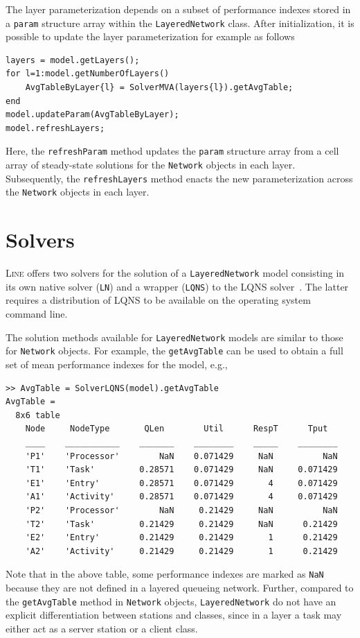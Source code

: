 The layer parameterization depends on a subset of performance indexes stored in a \texttt{param} structure array within the \texttt{LayeredNetwork} class. After initialization, it is possible to update the layer parameterization for example as follows
\begin{lstlisting}
layers = model.getLayers();
for l=1:model.getNumberOfLayers()
    AvgTableByLayer{l} = SolverMVA(layers{l}).getAvgTable;
end
model.updateParam(AvgTableByLayer);
model.refreshLayers;
\end{lstlisting}
Here, the \texttt{refreshParam} method updates the \texttt{param} structure array from a cell array of steady-state solutions for the \texttt{Network} objects in each layer. Subsequently, the \texttt{refreshLayers} method enacts the new parameterization across the \texttt{Network} objects in each layer.

\section{Solvers}
\textsc{Line} offers two solvers for the solution of a \texttt{LayeredNetwork} model consisting in its own native solver (\texttt{LN}) and a wrapper (\texttt{LQNS}) to the LQNS solver~\cite{lqns12}. The latter requires a distribution of LQNS to be available on the operating system command line.

The solution methods available for \texttt{LayeredNetwork} models are similar to those for \texttt{Network} objects. For example, the \texttt{getAvgTable} can be used to obtain a full set of mean performance indexes for the model, e.g.,
\begin{lstlisting}
>> AvgTable = SolverLQNS(model).getAvgTable
AvgTable =
  8x6 table
    Node     NodeType       QLen        Util      RespT      Tput
    ____    ___________    _______    ________    _____    ________
    'P1'    'Processor'        NaN    0.071429     NaN          NaN
    'T1'    'Task'         0.28571    0.071429     NaN     0.071429
    'E1'    'Entry'        0.28571    0.071429       4     0.071429
    'A1'    'Activity'     0.28571    0.071429       4     0.071429
    'P2'    'Processor'        NaN     0.21429     NaN          NaN
    'T2'    'Task'         0.21429     0.21429     NaN      0.21429
    'E2'    'Entry'        0.21429     0.21429       1      0.21429
    'A2'    'Activity'     0.21429     0.21429       1      0.21429
\end{lstlisting}
Note that in the above table, some performance indexes are marked as \texttt{NaN} because they are not defined in a layered queueing network. Further, compared to the \texttt{getAvgTable} method in \texttt{Network} objects, \texttt{LayeredNetwork} do not have an explicit differentiation between stations and classes, since in a layer a task may either act as a server station or a client class.

